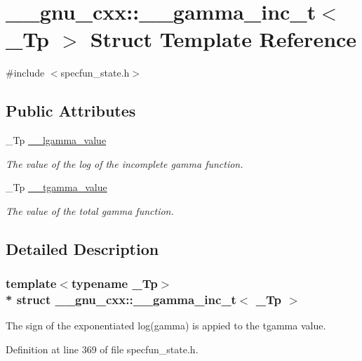 \hypertarget{struct____gnu__cxx_1_1____gamma__inc__t}{}\section{\+\_\+\+\_\+gnu\+\_\+cxx\+:\+:\+\_\+\+\_\+gamma\+\_\+inc\+\_\+t$<$ \+\_\+\+Tp $>$ Struct Template Reference}
\label{struct____gnu__cxx_1_1____gamma__inc__t}


{\ttfamily \#include $<$specfun\+\_\+state.\+h$>$}

\subsection*{Public Attributes}
\begin{DoxyCompactItemize}
\item 
\+\_\+\+Tp \hyperlink{struct____gnu__cxx_1_1____gamma__inc__t_a193b3f7871e371363571fe90b1ce1767}{\+\_\+\+\_\+lgamma\+\_\+value}
\begin{DoxyCompactList}\small\item\em The value of the log of the incomplete gamma function. \end{DoxyCompactList}\item 
\+\_\+\+Tp \hyperlink{struct____gnu__cxx_1_1____gamma__inc__t_a53d4ffc984c6685ce328caff424b5fe4}{\+\_\+\+\_\+tgamma\+\_\+value}
\begin{DoxyCompactList}\small\item\em The value of the total gamma function. \end{DoxyCompactList}\end{DoxyCompactItemize}


\subsection{Detailed Description}
\subsubsection*{template$<$typename \+\_\+\+Tp$>$\\*
struct \+\_\+\+\_\+gnu\+\_\+cxx\+::\+\_\+\+\_\+gamma\+\_\+inc\+\_\+t$<$ \+\_\+\+Tp $>$}

The sign of the exponentiated log(gamma) is appied to the tgamma value. 

Definition at line 369 of file specfun\+\_\+state.\+h.



